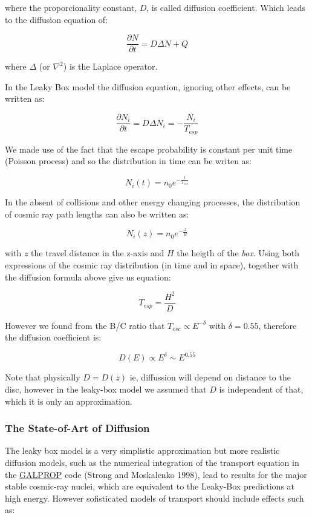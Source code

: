 \documentclass[
  letterpaper,
  DIV=11,
  numbers=noendperiod]{scrreprt}
\begin{document}
where the proporcionality constant, \(D\), is called diffusion
coefficient. Which leads to the diffusion equation of:

\[\frac{\partial N}{\partial t} =  D\Delta N + Q \]

where \(\Delta\) (or \(\nabla^2\)) is the Laplace operator.

In the Leaky Box model the diffusion equation, ignoring other effects,
can be written as:

\[\frac{\partial N_i}{\partial t} = D\Delta N_i =-\frac{N_i}{T_{esp}}\]

We made use of the fact that the escape probability is constant per unit
time (Poisson process) and so the distribution in time can be writen as:

\[N_i(t) = n_0 e^{-\frac{t}{T_{esc}}}\]

In the absent of collisions and other energy changing processes, the
distribution of cosmic ray path lengths can also be written as:

\[N_i(z) = n_0 e^{-\frac{z}{H}}\]

with \(z\) the travel distance in the z-axis and \(H\) the heigth of the
\emph{box}. Using both expressions of the cosmic ray distribution (in
time and in space), together with the diffusion formula above give us
equation:

\[T_{esp} = \frac{H^2}{D} \]

However we found from the B/C ratio that \(T_{esc} \propto E^{-\delta}\)
with \(\delta = 0.55\), therefore the diffusion coefficient is:

\[ D(E) \propto E^{\delta} \sim E^{0.55}\]

Note that physically \(D = D(z)\) ie, diffussion will depend on distance
to the disc, however in the leaky-box model we assumed that \(D\) is
independent of that, which it is only an approximation.

\subsubsection{The State-of-Art of
Diffusion}\label{the-state-of-art-of-diffusion}

The leaky box model is a very simplistic approximation but more
realistic diffusion models, such as the numerical integration of the
transport equation in the \href{https://galprop.stanford.edu/}{GALPROP}
code (Strong and Moskalenko 1998), lead to results for the major stable
cosmic-ray nuclei, which are equivalent to the Leaky-Box predictions at
high energy. However sofisticated models of transport should include
effects such as:
\end{document}
